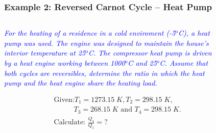 \documentclass[10pt,compress]{beamer}
\newcommand{\frc}{\displaystyle\frac}
\begin{document}
\begin{frame}
 \frametitle{Example 2: Reversed Carnot Cycle -- Heat Pump}
  \begin{columns}

   \begin{column}[c]{0.55\linewidth}
 \textcolor{blue}{{\it For the heating of a residence in a cold enviroment (-5$^{\text{o}}$C), a heat pump was used. The engine was designed to maintain the house's interior temperature at 25$^{\text{o}}$C. The compressor heat pump is driven by a heat engine working between 1000$^{\text{o}}$C and 25$^{\text{o}}$C. Assume that both cycles are reversibles, determine the ratio in which the heat pump and the heat engine share the heating load.}}

\begin{eqnarray}
&&\text{Given:} T_{1}=1273.15\;K, T_{2}=298.15\;K, \nonumber \\
            &&\;\;\;\;\;\;\;\;\;\;T_{3}=268.15\; K \text{ and } T_{4}=298.15\; K. \nonumber \\
&&\text{Calculate: } \frc{Q_{4}}{Q_{1}}=? \nonumber 
\end{eqnarray}

   \end{column}  

   \begin{column}[c]{0.45\linewidth}
    \begin{figure}%
     \begin{center}
      \includegraphics[width=6.8cm,height=7.cm]{./Pics/Overview_Refrig5}
     \end{center}
    \end{figure}  
   \end{column}  

\end{columns}
\end{frame}
\end{document}
